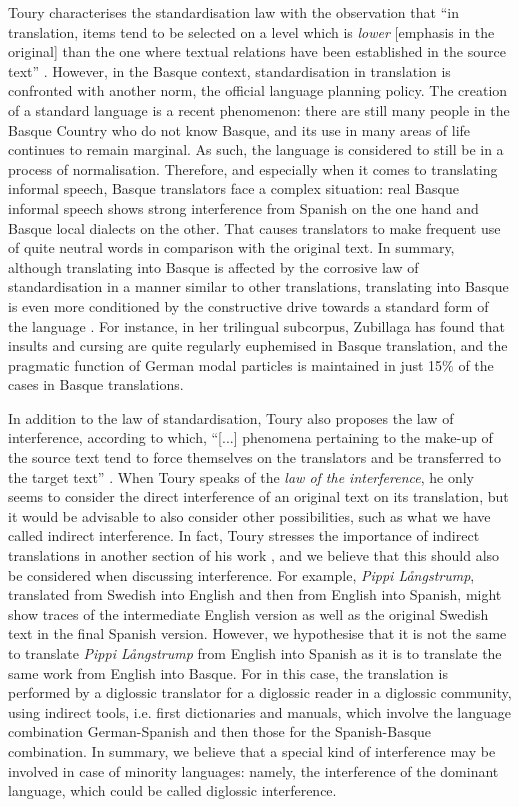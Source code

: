 \documentclass[output=paper]{LSP/langsci}
\begin{document}
Toury characterises the standardisation law with the observation that “in translation, items tend to be selected on a level which is \emph{lower} [emphasis in the original] than the one where textual relations have been established in the source text” \citep[305]{Toury2012}. However, in the Basque context, standardisation in translation is confronted with another norm, the official language planning policy. The creation of a standard language is a recent phenomenon: there are still many people in the Basque Country who do not know Basque, and its use in many areas of life continues to remain marginal. As such, the language is considered to still be in a process of normalisation. Therefore, and especially when it comes to translating informal speech, Basque translators face a complex situation: real Basque informal speech shows strong interference from Spanish on the one hand and Basque local dialects on the other. That causes translators to make frequent use of quite neutral words in comparison with the original text. In summary, although translating into Basque is affected by the corrosive law of standardisation in a manner similar to other translations, translating into Basque is even more conditioned by the constructive drive towards a standard form of the language \citep{Barambones2012}. For instance, in her trilingual subcorpus, Zubillaga has found that insults and cursing are quite regularly euphemised in Basque translation, and the pragmatic function of German modal particles is maintained in just 15\% of the cases in Basque translations.

In addition to the law of standardisation, Toury also proposes the law of interference, according to which, “[...] phenomena pertaining to the make-up of the source text tend to force themselves on the translators and be transferred to the target text” \citep[310]{Toury2012}. When Toury speaks of the \textit{law of the interference}, he only seems to consider the direct interference of an original text on its translation, but it would be advisable to also consider other possibilities, such as what we have called indirect interference. In fact, Toury stresses the importance of indirect translations in another section of his work \citep[129-146]{Toury1995}, and we believe that this should also be considered when discussing interference. For example, \textit{Pippi Långstrump}, translated from Swedish into English and then from English into Spanish, might show traces of the intermediate English version as well as the original Swedish text in the final Spanish version. However, we hypothesise that it is not the same to translate \textit{Pippi Långstrump} from English into Spanish as it is to translate the same work from English into Basque. For in this case, the translation is performed by a diglossic translator for a diglossic reader in a diglossic community, using indirect tools, i.e. first dictionaries and manuals, which involve the language combination German-Spanish and then those for the Spanish-Basque combination. In summary, we believe that a special kind of interference may be involved in case of minority languages: namely, the interference of the dominant language, which could be called diglossic interference.
\end{document}
